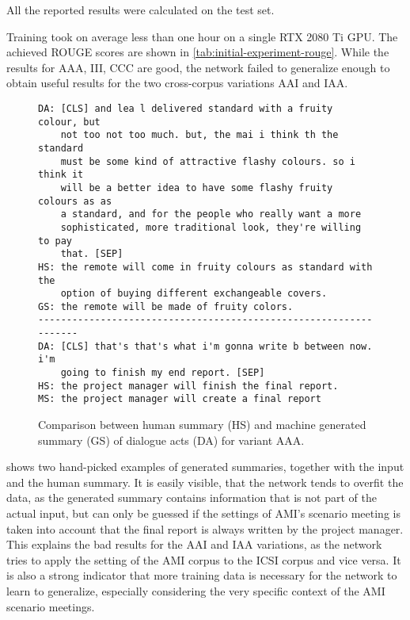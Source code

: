 All the reported results were calculated on the test set.

Training took on average less than one hour on a single RTX 2080 Ti GPU.
The achieved ROUGE scores are shown in \cref{tab:initial-experiment-rouge}.
While the results for AAA, III, CCC are good, the network failed to generalize enough to obtain useful results for the two cross-corpus variations AAI and IAA.

\begin{figure}[h]
\begin{lstlisting}[numbers=none]
DA: [CLS] and lea l delivered standard with a fruity colour, but
    not too not too much. but, the mai i think th the standard
    must be some kind of attractive flashy colours. so i think it
    will be a better idea to have some flashy fruity colours as as
    a standard, and for the people who really want a more
    sophisticated, more traditional look, they're willing to pay
    that. [SEP]
HS: the remote will come in fruity colours as standard with the
    option of buying different exchangeable covers.
GS: the remote will be made of fruity colors.
------------------------------------------------------------------
DA: [CLS] that's that's what i'm gonna write b between now. i'm
    going to finish my end report. [SEP]
HS: the project manager will finish the final report.
MS: the project manager will create a final report
\end{lstlisting}
\caption{Comparison between human summary (HS) and machine generated summary (GS) of dialogue acts (DA) for variant AAA.}
\label{fig:initial-experiment-example}
\end{figure}

 shows two hand-picked examples of generated summaries, together with the input and the human summary.
It is easily visible, that the network tends to overfit the data, as the generated summary contains information that is not part of the actual input, but can only be guessed if the settings of AMI's scenario meeting is taken into account \eg that the final report is always written by the project manager.
This explains the bad results for the AAI and IAA variations, as the network tries to apply the setting of the AMI corpus to the ICSI corpus and vice versa.
It is also a strong indicator that more training data is necessary for the network to learn to generalize, especially considering the very specific context of the AMI scenario meetings.

